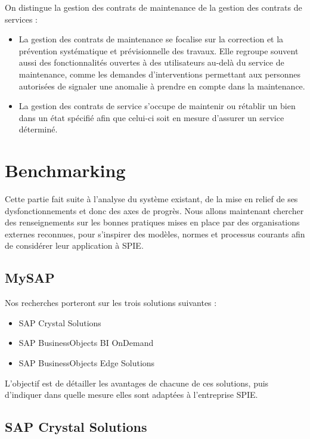 On distingue la gestion des contrats de maintenance de la gestion des contrats de services :

\begin{itemize}
\item La gestion des contrats de maintenance se focalise sur la correction et la prévention systématique et prévisionnelle des travaux. Elle regroupe souvent aussi des fonctionnalités ouvertes à des utilisateurs au-delà du service de maintenance, comme les demandes d’interventions permettant aux personnes autorisées de signaler une anomalie à prendre en compte dans la maintenance.
\item La gestion des contrats de service s’occupe de maintenir ou rétablir un bien dans un état spécifié afin que celui-ci soit en mesure d’assurer un service déterminé.
\end{itemize}

\section{Benchmarking}

Cette partie fait suite à l'analyse du système existant, de la mise en relief de ses dysfonctionnements et donc des axes de progrès. Nous allons maintenant chercher des renseignements sur les bonnes pratiques mises en place par des organisations externes reconnues, pour s'inspirer des modèles, normes et processus courants afin de considérer leur application à SPIE.

\subsection{MySAP}

Nos recherches porteront sur les trois solutions suivantes :

\begin{itemize}
\item SAP Crystal Solutions
\item SAP BusinessObjects BI OnDemand
\item SAP BusinessObjects Edge Solutions
\end{itemize}

L'objectif est de détailler les avantages de chacune de ces solutions, puis d'indiquer dans quelle mesure elles sont adaptées à l’entreprise SPIE.

\subsection{SAP Crystal Solutions}

